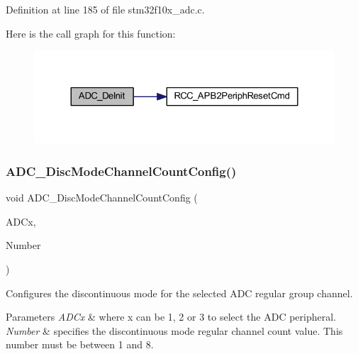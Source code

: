Definition at line 185 of file stm32f10x\+\_\+adc.\+c.

Here is the call graph for this function\+:
\nopagebreak
\begin{figure}[H]
\begin{center}
\leavevmode
\includegraphics[width=324pt]{group___a_d_c___private___functions_ga31fa6bc09de17125e9db2830ce77c09b_cgraph}
\end{center}
\end{figure}
\mbox{\label{group___a_d_c___private___functions_ga6eb241ba82d67d1371136c9132083937}} 
\subsubsection{\texorpdfstring{A\+D\+C\+\_\+\+Disc\+Mode\+Channel\+Count\+Config()}{ADC\_DiscModeChannelCountConfig()}}
{\footnotesize\ttfamily void A\+D\+C\+\_\+\+Disc\+Mode\+Channel\+Count\+Config (\begin{DoxyParamCaption}\item[{\hyperlink{struct_a_d_c___type_def}{A\+D\+C\+\_\+\+Type\+Def} $\ast$}]{A\+D\+Cx,  }\item[{uint8\+\_\+t}]{Number }\end{DoxyParamCaption})}



Configures the discontinuous mode for the selected A\+DC regular group channel. 


\begin{DoxyParams}{Parameters}
{\em A\+D\+Cx} & where x can be 1, 2 or 3 to select the A\+DC peripheral. \\
\hline
{\em Number} & specifies the discontinuous mode regular channel count value. This number must be between 1 and 8. \\
\hline
\end{DoxyParams}

